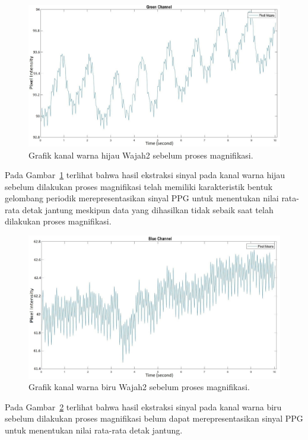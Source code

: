 \begin{figure}[ht]
	\vspace{0.5em}
	\centering
	\includegraphics[width=\textwidth,height=0.25\textheight]{Green_channel_wajah2-ori}
	\caption{Grafik kanal warna hijau Wajah2 sebelum proses magnifikasi.}
	\label{fig:grafik-green-wajah2}   
\end{figure}
Pada Gambar~\ref{fig:grafik-green-wajah2} terlihat bahwa hasil ekstraksi sinyal pada kanal warna hijau sebelum dilakukan proses magnifikasi telah memiliki karakteristik bentuk gelombang periodik merepresentasikan sinyal PPG untuk menentukan nilai rata-rata detak jantung meskipun data yang dihasilkan tidak sebaik saat telah dilakukan proses magnifikasi.
\newpage
\begin{figure}[ht]
	\vspace{0.5em}
	\centering
	\includegraphics[width=\textwidth,height=0.25\textheight]{Blue_channel_wajah2-ori}
	\caption{Grafik kanal warna biru Wajah2 sebelum proses magnifikasi.}
	\label{fig:grafik-blue-wajah2}   
\end{figure}
Pada Gambar~\ref{fig:grafik-blue-wajah2} terlihat bahwa hasil ekstraksi sinyal pada kanal warna biru sebelum dilakukan proses magnifikasi belum dapat merepresentasikan sinyal PPG untuk menentukan nilai rata-rata detak jantung.

